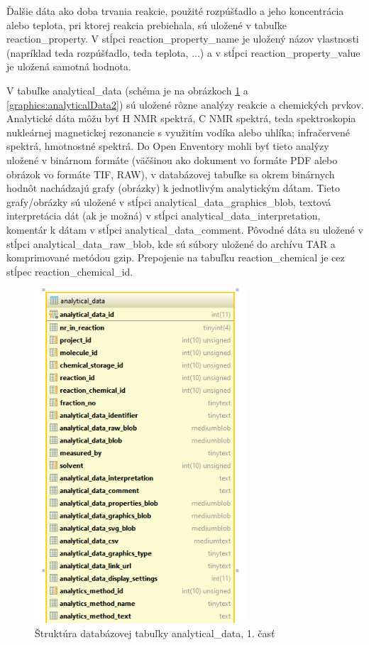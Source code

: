 \documentclass[thesis=M,slovak]{FITthesis}[2013/05/06]
\begin{document}
Ďalšie dáta ako doba trvania reakcie, použité rozpúšťadlo a jeho koncentrácia alebo teplota, pri ktorej reakcia prebiehala, sú uložené v tabuľke reaction\_property. V stĺpci reaction\_property\_name je uložený názov vlastnosti (napríklad  teda rozpúšťadlo,  teda teplota, ...) a v stĺpci reaction\_property\_value je uložená samotná hodnota.

V tabuľke analytical\_data (schéma je na obrázkoch \ref{graphics:analyticalData1} a \ref{graphics:analyticalData2}) sú uložené rôzne analýzy reakcie a chemických prvkov. Analytické dáta môžu byť H NMR spektrá, C NMR spektrá, teda spektroskopia nukleárnej magnetickej rezonancie s využitím vodíka alebo uhlíka; infračervené spektrá, hmotnostné spektrá. Do Open Enventory mohli byť tieto analýzy uložené v binárnom formáte (väčšinou ako dokument vo formáte PDF alebo obrázok vo formáte TIF, RAW), v databázovej tabuľke sa okrem binárnych hodnôt nachádzajú grafy (obrázky) k jednotlivým analytickým dátam. Tieto grafy/obrázky sú uložené v stĺpci  analytical\_data\_graphics\_blob, textová interpretácia dát (ak je možná) v stĺpci analytical\_data\_interpretation, komentár k dátam v stĺpci analytical\_data\_comment. Pôvodné dáta su uložené v stĺpci analytical\_data\_raw\_blob, kde sú súbory uložené do archívu TAR a komprimované metódou gzip. Prepojenie na tabuľku reaction\_chemical je cez stĺpec reaction\_chemical\_id.

\begin{figure}\centering
	\includegraphics[width=0.7\textwidth]{Schema_DB_Open_Enventory/analytical_data1.png}
 	\caption[Štruktúra databázovej tabuľky analytical\_data, 1. časť]{Štruktúra databázovej tabuľky analytical\_data, 1. časť}\label{graphics:analyticalData1}
\end{figure}
\end{document}
